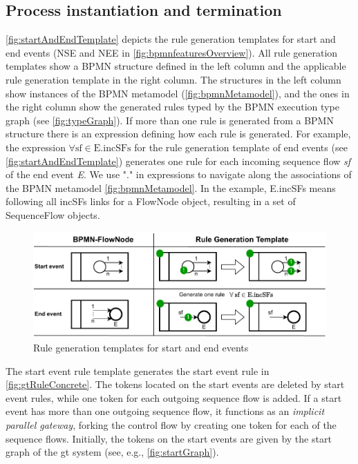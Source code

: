 \documentclass[runningheads]{llncs}
\begin{document}
\subsection{Process instantiation and termination} \label{subsec:instAndTermination}

\autoref{fig:startAndEndTemplate} depicts the rule generation templates for start and end events (\textsf{NSE} and \textsf{NEE} in \autoref{fig:bpmnfeaturesOverview}).
All rule generation templates show a BPMN structure defined in the left column and the applicable rule generation template in the right column.
The structures in the left column show instances of the BPMN metamodel (\autoref{fig:bpmnMetamodel}), and the ones in the right column show the generated rules typed by the BPMN execution type graph (see \autoref{fig:typeGraph}).
If more than one rule is generated from a BPMN structure there is an expression defining how each rule is generated.
For example, the expression $\forall \text{sf} \in \text{E.incSFs}$ for the rule generation template of end events (see \autoref{fig:startAndEndTemplate}) generates one rule for each incoming sequence flow \textit{sf} of the end event \textit{E}.
We use "." in expressions to navigate along the associations of the BPMN metamodel \autoref{fig:bpmnMetamodel}.
In the example, \textsf{E.incSFs} means following all \textsf{incSFs} links for a \textsf{FlowNode} object, resulting in a set of \textsf{SequenceFlow} objects.



\begin{figure}[ht]
    \centering
    \includegraphics[width=.9\textwidth]{images/start_end_template.pdf}
    \caption{Rule generation templates for start and end events}
    \label{fig:startAndEndTemplate}
\end{figure}

The start event rule template generates the start event rule in \autoref{fig:gtRuleConcrete}.
The tokens located on the start events are deleted by start event rules, while one token for each outgoing sequence flow is added.
If a start event has more than one outgoing sequence flow, it functions as an \textit{implicit parallel gateway}, forking the control flow by creating one token for each of the sequence flows.
Initially, the tokens on the start events are given by the start graph of the \gls*{gt} system (see, e.g., \autoref{fig:startGraph}).
    
\end{document}
